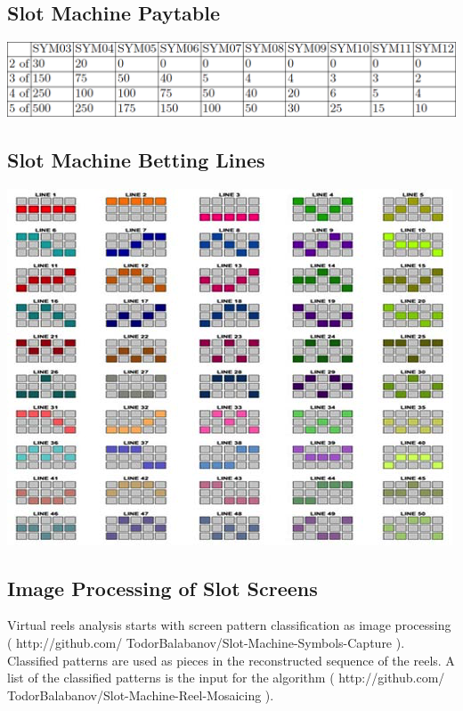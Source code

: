\documentclass[a0,portrait,25pt]{sciposter}
\begin{document}
\begin{multicols}{3}
\begin{mdframed}[backgroundcolor=white,roundcorner=4pt,shadow=true,linewidth=1pt]
\section*{Slot Machine Paytable}
\begin{minipage}[c]{1\linewidth}
\includegraphics[width=1.0\linewidth]{pic002}
\end{minipage}
\end{mdframed}

\begin{mdframed}[backgroundcolor=white,roundcorner=4pt,shadow=true,linewidth=1pt]
\section*{Slot Machine Betting Lines}
\begin{minipage}[c]{1\linewidth}
\includegraphics[width=0.9\linewidth]{pic001}
\end{minipage}
\end{mdframed}

\begin{mdframed}[backgroundcolor=white,roundcorner=4pt,shadow=true,linewidth=1pt]
\color{Black}
\section*{Image Processing of Slot Screens}
Virtual reels analysis starts with screen pattern classification as image processing ( http://github.com/ TodorBalabanov/Slot-Machine-Symbols-Capture ). Classified patterns are used as pieces in the reconstructed sequence of the reels. A list of the classified patterns is the input for the algorithm ( http://github.com/ TodorBalabanov/Slot-Machine-Reel-Mosaicing ). 
\end{mdframed}


\end{multicols}
\end{document}
